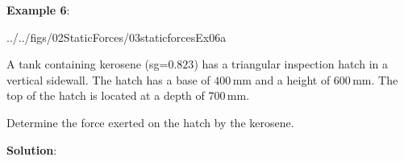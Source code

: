 \documentclass[10pt,onesided]{amsart}
\begin{document}
\begin{minipage}[t]{0.45\textwidth}
	\textbf{Example 6}:\\
	\begin{cfig}[0.65]{../../figs/02StaticForces/03staticforcesEx06a}\end{cfig}
	\raggedright
	A tank containing kerosene (sg=$0.823$) has a triangular inspection hatch in a vertical sidewall. The hatch has
	a base of $400\,\text{mm}$ and a height of $600\,\text{mm}$. The top of the hatch is located at a depth of $700\,\text{mm}$.
	\par\smallskip
	Determine the force exerted on the hatch by the kerosene.
\end{minipage}
\hfill
\begin{minipage}[t]{0.5\textwidth}
	\textbf{Solution}:
	\par\bigskip
\end{minipage}

\newpage
\end{document}
